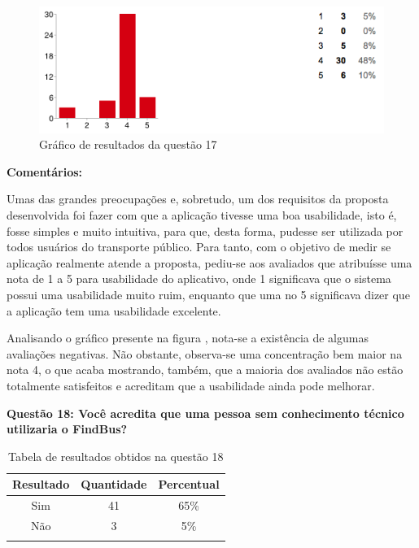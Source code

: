 \begin{figure}[h]
\begin{center}
  \includegraphics[width=16cm]{images/graficos/questao17.png}
  \caption{Gráfico de resultados da questão 17}
  \label{fig:questao17}
\end{center}
\end{figure}

\textbf{Comentários:}

Umas das grandes preocupações e, sobretudo, um dos requisitos da proposta desenvolvida foi fazer com que a aplicação tivesse uma boa usabilidade, isto é, fosse simples e muito intuitiva, para que, desta forma, pudesse ser utilizada por todos usuários do transporte público. Para tanto, com o objetivo de medir se aplicação realmente atende a proposta, pediu-se aos avaliados que atribuísse uma nota de 1 a 5 para usabilidade do aplicativo, onde 1 significava que o sistema possui uma usabilidade muito ruim, enquanto que uma no 5 significava dizer que a aplicação tem uma usabilidade excelente.
	
Analisando o gráfico presente na figura , nota-se a existência de algumas avaliações negativas. Não obstante, observa-se uma concentração bem maior na nota 4, o que acaba mostrando, também, que a maioria dos avaliados não estão totalmente satisfeitos e acreditam que a usabilidade ainda pode melhorar. \newline

\textbf{Questão 18: Você acredita que uma pessoa sem conhecimento técnico utilizaria o FindBus?}


\begin{center}
\begin{longtable}{c|c|c}
\hline
    \multicolumn{1}{c}{\textbf{Resultado}} & \multicolumn{1}{c}{\textbf{Quantidade}} & \multicolumn{1}{c}{\textbf{Percentual}} \\
\hline
    Sim & 41 &  65\%\\
    \hline
    Não & 3 & 5\%\\
    \hline
\caption{Tabela de resultados obtidos na questão 18}
\label{tabq18}
\end{longtable}
\end{center}

